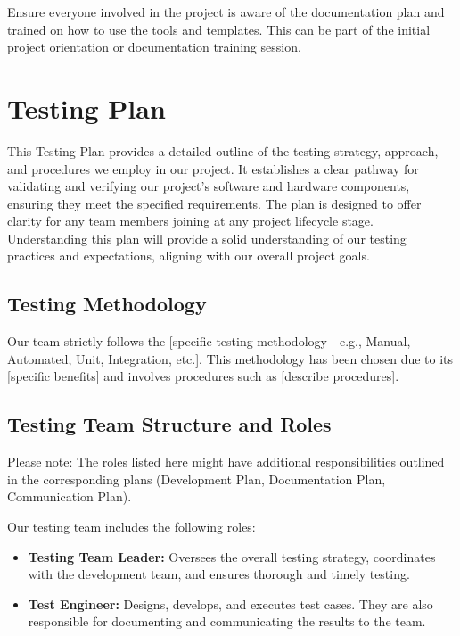 \documentclass[10pt]{projectdoc}
\begin{document}
Ensure everyone involved in the project is aware of the documentation plan and trained on how to use the tools and templates. This can be part of the initial project orientation or documentation training session.

\newpage
\section{Testing Plan}
This Testing Plan provides a detailed outline of the testing strategy, approach, and procedures we employ in our project. It establishes a clear pathway for validating and verifying our project's software and hardware components, ensuring they meet the specified requirements. The plan is designed to offer clarity for any team members joining at any project lifecycle stage. Understanding this plan will provide a solid understanding of our testing practices and expectations, aligning with our overall project goals.

\subsection{Testing Methodology}

Our team strictly follows the [specific testing methodology - e.g., Manual, Automated, Unit, Integration, etc.]. This methodology has been chosen due to its [specific benefits] and involves procedures such as [describe procedures].

\subsection{Testing Team Structure and Roles}

Please note: The roles listed here might have additional responsibilities outlined in the corresponding plans (Development Plan, Documentation Plan, Communication Plan).

Our testing team includes the following roles:

\begin{itemize}
\item \textbf{Testing Team Leader:} Oversees the overall testing strategy, coordinates with the development team, and ensures thorough and timely testing.
\item \textbf{Test Engineer:} Designs, develops, and executes test cases. They are also responsible for documenting and communicating the results to the team.
\end{itemize}
\end{document}

